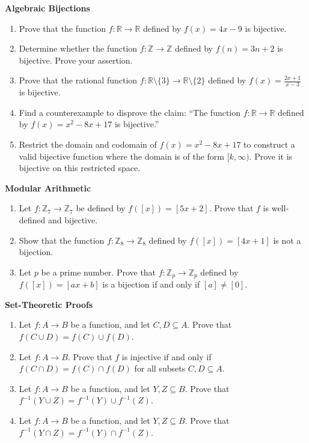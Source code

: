 \documentclass[11pt, letterpaper]{article}
\theoremstyle{definition}
\theoremstyle{remark}
\newcommand{\R}{\mathbb{R}}
\newcommand{\Z}{\mathbb{Z}}
\begin{document}
\textbf{Algebraic Bijections}
\begin{enumerate}[label=\textbf{\arabic*.}]
    \item Prove that the function $f : \R \to \R$ defined by $f(x) = 4x - 9$ is bijective.
    \item Determine whether the function $f : \Z \to \Z$ defined by $f(n) = 3n + 2$ is bijective. Prove your assertion.
    \item Prove that the rational function $f : \R \setminus \{3\} \to \R \setminus \{2\}$ defined by $f(x) = \frac{2x+1}{x-3}$ is bijective.
    \item Find a counterexample to disprove the claim: ``The function $f : \R \to \R$ defined by $f(x) = x^2 - 8x + 17$ is bijective.''
    \item Restrict the domain and codomain of $f(x) = x^2 - 8x + 17$ to construct a valid bijective function where the domain is of the form $[k, \infty)$. Prove it is bijective on this restricted space.
\end{enumerate}

\textbf{Modular Arithmetic}
\begin{enumerate}[label=\textbf{\arabic*.}, resume]
    \item Let $f : \Z_7 \to \Z_7$ be defined by $f([x]) = [5x + 2]$. Prove that $f$ is well-defined and bijective.
    \item Show that the function $f : \Z_8 \to \Z_8$ defined by $f([x]) = [4x + 1]$ is not a bijection.
    \item Let $p$ be a prime number. Prove that $f : \Z_p \to \Z_p$ defined by $f([x]) = [ax + b]$ is a bijection if and only if $[a] \neq [0]$.
\end{enumerate}

\textbf{Set-Theoretic Proofs}
\begin{enumerate}[label=\textbf{\arabic*.}, resume]
    \item Let $f : A \to B$ be a function, and let $C, D \subseteq A$. Prove that $f(C \cup D) = f(C) \cup f(D)$.
    \item Let $f : A \to B$. Prove that $f$ is injective if and only if $f(C \cap D) = f(C) \cap f(D)$ for all subsets $C, D \subseteq A$.
    \item Let $f : A \to B$ be a function, and let $Y, Z \subseteq B$. Prove that $f^{-1}(Y \cup Z) = f^{-1}(Y) \cup f^{-1}(Z)$.
    \item Let $f : A \to B$ be a function, and let $Y, Z \subseteq B$. Prove that $f^{-1}(Y \cap Z) = f^{-1}(Y) \cap f^{-1}(Z)$.
\end{enumerate}
\end{document}
